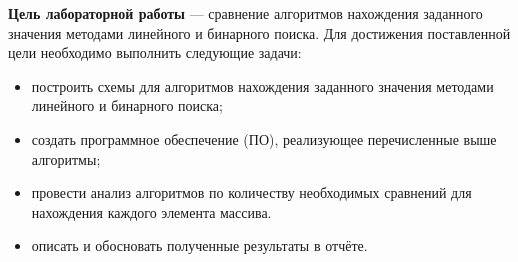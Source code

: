 
\textbf{Цель лабораторной работы} --- сравнение алгоритмов нахождения заданного значения методами линейного и бинарного поиска. Для достижения поставленной цели необходимо выполнить следующие задачи:

\begin{itemize}
\item построить схемы для алгоритмов нахождения заданного значения методами линейного и бинарного поиска;
\item создать программное обеспечение (ПО), реализующее перечисленные выше алгоритмы;
\item провести анализ алгоритмов по количеству необходимых сравнений для нахождения каждого элемента массива.
\item описать и обосновать полученные результаты в отчёте.
\end{itemize}
